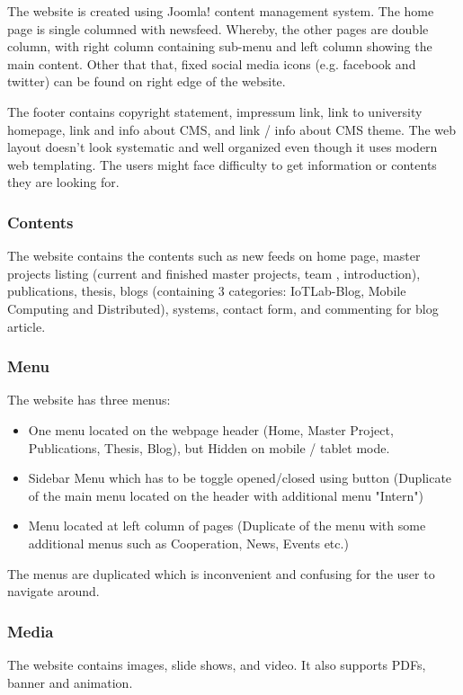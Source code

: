 The website is created using Joomla! content management system. The home page is single columned with newsfeed. Whereby, the other pages are double column, with right column containing sub-menu and left column showing the main content. Other that that, fixed social media icons (e.g. facebook and twitter) can be found on right edge of the website.

The footer contains copyright statement, impressum link, link to university homepage, link and info about CMS, and link / info about CMS theme. The web layout doesn't look systematic and well organized even though 
it uses modern web templating. The users might face difficulty to get  information or contents they are looking for.

\subsubsection*{Contents}
The website contains the contents such as new feeds on home page, master projects listing (current and finished master projects, team , introduction), publications, thesis, blogs (containing 3 categories: IoTLab-Blog, Mobile Computing and Distributed), systems, contact form, and commenting for blog article.

\subsubsection*{Menu}
The website has three menus:
\begin{itemize}
\item One menu located on the webpage header (Home, Master Project, Publications,  Thesis, Blog), but Hidden on mobile / tablet mode.
\item Sidebar Menu which has to be toggle opened/closed using button (Duplicate of  the main menu located on the header with additional menu "Intern")
\item Menu located at left column of pages (Duplicate of the menu with some  additional menus such as Cooperation, News, Events etc.)
\end{itemize}

The menus are duplicated which is inconvenient and confusing for the user to navigate around.

\subsubsection*{Media}
The website contains images, slide shows, and video. It also supports PDFs, banner and animation.

